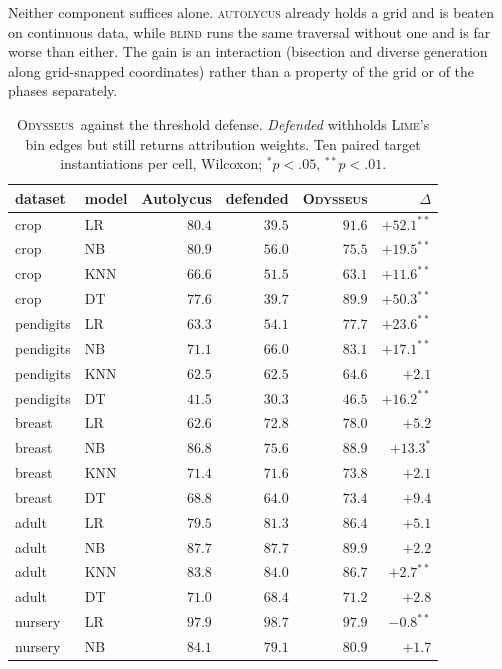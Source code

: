 \documentclass[sigconf,anonymous,review]{acmart}
\newcommand{\sys}{\textsc{Odysseus}}
\begin{document}
Neither component suffices alone. \textsc{autolycus} already holds a grid and is beaten on continuous data, while \textsc{blind} runs the same traversal without one and is far worse than either. The gain is an interaction (bisection and diverse generation along grid-snapped coordinates) rather than a property
of the grid or of the phases separately.

\begin{table}[t]
\centering
\caption{\sys\ against the threshold defense. \emph{Defended} withholds \textsc{Lime}'s bin edges but still
returns attribution weights. Ten paired target instantiations per cell, Wilcoxon; $^{*}p{<}.05$,
$^{**}p{<}.01$.}
\label{tab:defense}
\begin{tabular}{llrrrr}
\toprule
dataset & model & Autolycus & defended & \sys & $\Delta$ \\
\midrule
crop       & LR   & $80.4$ & $39.5$ & $91.6$ & $+52.1^{**}$ \\
crop       & NB   & $80.9$ & $56.0$ & $75.5$ & $+19.5^{**}$ \\
crop       & KNN  & $66.6$ & $51.5$ & $63.1$ & $+11.6^{**}$ \\
crop       & DT   & $77.6$ & $39.7$ & $89.9$ & $+50.3^{**}$ \\
pendigits  & LR   & $63.3$ & $54.1$ & $77.7$ & $+23.6^{**}$ \\
pendigits  & NB   & $71.1$ & $66.0$ & $83.1$ & $+17.1^{**}$ \\
pendigits  & KNN  & $62.5$ & $62.5$ & $64.6$ & $+2.1$ \\
pendigits  & DT   & $41.5$ & $30.3$ & $46.5$ & $+16.2^{**}$ \\
breast     & LR   & $62.6$ & $72.8$ & $78.0$ & $+5.2$ \\
breast     & NB   & $86.8$ & $75.6$ & $88.9$ & $+13.3^{*}$ \\
breast     & KNN  & $71.4$ & $71.6$ & $73.8$ & $+2.1$ \\
breast     & DT   & $68.8$ & $64.0$ & $73.4$ & $+9.4$ \\
adult      & LR   & $79.5$ & $81.3$ & $86.4$ & $+5.1$ \\
adult      & NB   & $87.7$ & $87.7$ & $89.9$ & $+2.2$ \\
adult      & KNN  & $83.8$ & $84.0$ & $86.7$ & $+2.7^{**}$ \\
adult      & DT   & $71.0$ & $68.4$ & $71.2$ & $+2.8$ \\
nursery    & LR   & $97.9$ & $98.7$ & $97.9$ & $-0.8^{**}$ \\
nursery    & NB   & $84.1$ & $79.1$ & $80.9$ & $+1.7$ \\

\end{tabular}
\end{table}
\end{document}
